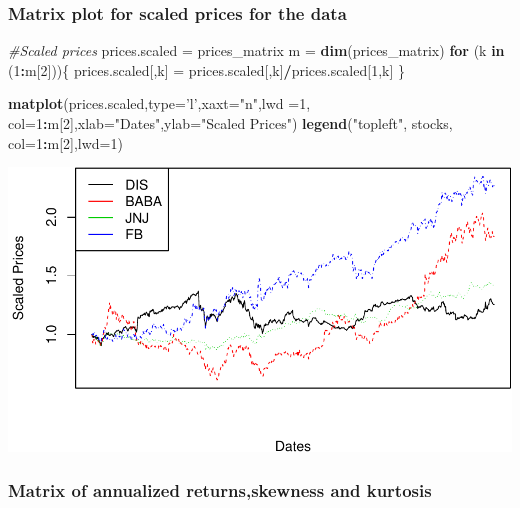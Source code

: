 \documentclass[]{article}
\newenvironment{Shaded}{\begin{snugshade}}{\end{snugshade}}
\newcommand{\KeywordTok}[1]{\textcolor[rgb]{0.13,0.29,0.53}{\textbf{#1}}}
\newcommand{\DataTypeTok}[1]{\textcolor[rgb]{0.13,0.29,0.53}{#1}}
\newcommand{\DecValTok}[1]{\textcolor[rgb]{0.00,0.00,0.81}{#1}}
\newcommand{\StringTok}[1]{\textcolor[rgb]{0.31,0.60,0.02}{#1}}
\newcommand{\CommentTok}[1]{\textcolor[rgb]{0.56,0.35,0.01}{\textit{#1}}}
\newcommand{\ControlFlowTok}[1]{\textcolor[rgb]{0.13,0.29,0.53}{\textbf{#1}}}
\newcommand{\OperatorTok}[1]{\textcolor[rgb]{0.81,0.36,0.00}{\textbf{#1}}}
\newcommand{\NormalTok}[1]{#1}
\begin{document}
\subsubsection{Matrix plot for scaled prices for the
data}\label{matrix-plot-for-scaled-prices-for-the-data}

\begin{Shaded}
\begin{Highlighting}[]
\CommentTok{#Scaled prices}
\NormalTok{prices.scaled =}\StringTok{ }\NormalTok{prices_matrix}
\NormalTok{m =}\StringTok{ }\KeywordTok{dim}\NormalTok{(prices_matrix)}
\ControlFlowTok{for}\NormalTok{ (k }\ControlFlowTok{in}\NormalTok{ (}\DecValTok{1}\OperatorTok{:}\NormalTok{m[}\DecValTok{2}\NormalTok{]))\{}
\NormalTok{  prices.scaled[,k] =}\StringTok{ }\NormalTok{prices.scaled[,k]}\OperatorTok{/}\NormalTok{prices.scaled[}\DecValTok{1}\NormalTok{,k]}
\NormalTok{\}}

\KeywordTok{matplot}\NormalTok{(prices.scaled,}\DataTypeTok{type=}\StringTok{'l'}\NormalTok{,}\DataTypeTok{xaxt=}\StringTok{"n"}\NormalTok{,}\DataTypeTok{lwd =}\DecValTok{1}\NormalTok{,}
        \DataTypeTok{col=}\DecValTok{1}\OperatorTok{:}\NormalTok{m[}\DecValTok{2}\NormalTok{],}\DataTypeTok{xlab=}\StringTok{"Dates"}\NormalTok{,}\DataTypeTok{ylab=}\StringTok{"Scaled Prices"}\NormalTok{)}
\KeywordTok{legend}\NormalTok{(}\StringTok{"topleft"}\NormalTok{, stocks, }\DataTypeTok{col=}\DecValTok{1}\OperatorTok{:}\NormalTok{m[}\DecValTok{2}\NormalTok{],}\DataTypeTok{lwd=}\DecValTok{1}\NormalTok{)}
\end{Highlighting}
\end{Shaded}

\includegraphics{Markowitz_Research_Me_files/figure-latex/unnamed-chunk-7-1.pdf}

\subsubsection{Matrix of annualized returns,skewness and
kurtosis}\label{matrix-of-annualized-returnsskewness-and-kurtosis}
\end{document}
